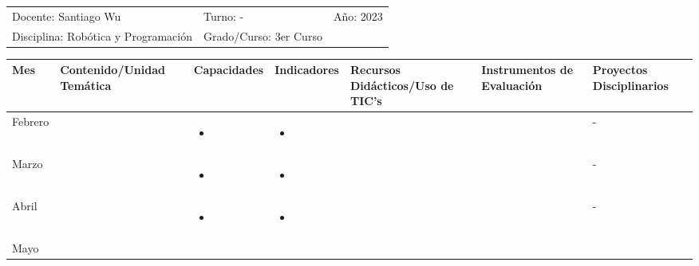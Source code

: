 \documentclass[landscape, a4paper, 10pt]{article}
\newcommand{\smallcellwidth}{0.7in}
\newcommand{\normalcellwidth}{1.2in}
\newcommand{\bigcellwidth}{2.0in}
\newcommand{\profesor}{Santiago Wu}
\newcommand{\discipline}{Robótica y Programación}
\newcommand{\currentyear}{2023}
\begin{document}
	\pagebreak[4]
	\begin{tabularx}{\textwidth}{ >{\raggedright\arraybackslash}X >{\raggedright\arraybackslash}X >{\raggedright\arraybackslash}X }
		Docente: \profesor &
		Turno: - &
		Año: \currentyear \\
		Disciplina: \discipline &
		Grado/Curso: 3er Curso &
		 \\
	\end{tabularx}
	\centering
	\begin{longtable}{|m{\smallcellwidth}|p{\normalcellwidth}|p{\bigcellwidth}|p{\bigcellwidth}|p{\normalcellwidth}|p{\normalcellwidth}|p{\normalcellwidth}|}
		\hline
		\textbf{Mes} &
		\textbf{Contenido/Unidad Temática} &
		\textbf{Capacidades} &
		\textbf{Indicadores} &
		\textbf{Recursos Didácticos/Uso de TIC's} &
		\textbf{Instrumentos de Evaluación} &
		\textbf{Proyectos Disciplinarios} \\
		\hline
		\endhead
		Febrero &
		 &
		\begin{itemize}
			\item 
		\end{itemize} &
		\begin{itemize}
			\item 
		\end{itemize} &
		  &
		  &
		 - \\
		\hline
		Marzo &
		 &
		\begin{itemize}
			\item 
		\end{itemize} &
		\begin{itemize}
			\item 
		\end{itemize} &
		  &
		  &
		 - \\
		\hline
		Abril &
		 &
		\begin{itemize}
			\item 
		\end{itemize} &
		\begin{itemize}
			\item 
		\end{itemize} &
		  &
		  &
		 - \\
		\hline
		Mayo &
		 &
		\begin{itemize}

\end{itemize}
\end{longtable}
\end{document}
